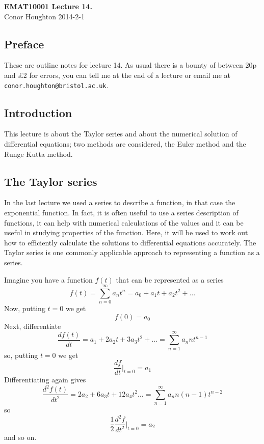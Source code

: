 \documentclass[12pt]{article}
\begin{document}
\begin{center}
{\bf EMAT10001 Lecture 14.}\\[1cm]{} Conor Houghton 2014-2-1
\end{center}
\subsection*{Preface} 
These are outline notes for lecture 14. As usual there is a bounty of
between 20p and \pounds 2 for errors, you can tell me at the end of a
lecture or email me at \texttt{conor.houghton{@}bristol.ac.uk}.

\subsection*{Introduction}

This lecture is about the Taylor series and about the numerical
solution of differential equations; two methods are considered, the
Euler method and the Runge Kutta method.

\subsection*{The Taylor series}

In the last lecture we used a series to describe a function, in that
case the exponential function. In fact, it is often useful to use a
series description of functions, it can help with numerical
calculations of the values and it can be useful in studying properties
of the function. Here, it will be used to work out how to efficiently
calculate the solutions to differential equations accurately. The
Taylor series is one commonly applicable approach to representing a
function as a series.

Imagine you have a function $f(t)$ that can be represented as a series
\begin{equation}
f(t)=\sum_{n=0}^\infty{a_nt^n}=a_0+a_1t+a_2t^2+\ldots
\end{equation}
Now, putting $t=0$ we get
\begin{equation}
f(0)=a_0
\end{equation}
Next, differentiate
\begin{equation}
\frac{df(t)}{dt}=a_1+2a_2t+3a_3t^2+\ldots=\sum_{n=1}^\infty{a_nnt^{n-1}}
\end{equation}
so, putting $t=0$ we get
\begin{equation}
\frac{df}{dt}|_{t=0}=a_1
\end{equation}
Differentiating again gives
\begin{equation}
\frac{d^2f(t)}{dt^2}=2a_2+6a_3t+12a_4t^2\ldots=\sum_{n=1}^\infty{a_nn(n-1)t^{n-2}}
\end{equation}
so
\begin{equation}
\frac{1}{2}\frac{d^2f}{dt^2}|_{t=0}=a_2
\end{equation}
and so on.
\end{document}
